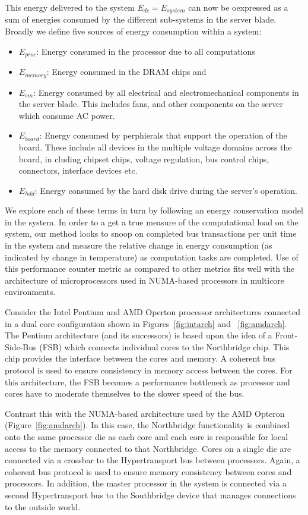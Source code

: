 \documentclass[12pt,onecolumn]{ULieeetran}
\begin{document}
This energy delivered to the system $E_{dc} = E_{system}$ can now be
oexpressed as a sum of energies consumed by the different sub-systems in
the server blade.  Broadly we define five sources of energy consumption
within a system:
\begin{itemize}
\item $E_{proc}$: Energy consumed in the processor due to all
  computations
\item $E_{memory}$: Energy consumed in the DRAM chips and
\item $E_{em}$: Energy consumed by all electrical and electromechanical
  components in the server blade.  This includes fans, and other
  components on the server which consume AC power.
\item $E_{board}$: Energy consumed by perphierals that support the
  operation of the board. These include all devices in the multiple
  voltage domains across the board, in cluding chipset chips, voltage
  regulation, bus control chips, connectors, interface devices etc.
\item $E_{hdd}$: Energy consumed by the hard disk drive during the
  server's operation.
\end{itemize}

We explore each of these terms in turn by following an energy
conservation model in the system.  In order to a get a true measure of
the computational load on the system, our method looks to snoop on
completed bus transactions per unit time in the system and measure the
relative change in energy consumption (as indicated by change in
temperature) as computation tasks are completed.  Use of this
performance counter metric as compared to other metrics fits well with
the architecture of microprocessors used in NUMA-based processors in
multicore environments.

Consider the Intel Pentium and AMD Operton processor architectures
connected in a dual core configuration shown in
Figures~\ref{fig:intarch} and ~\ref{fig:amdarch}.  The Pentium
architecture (and its successors) is based upon the idea of a
Front-Side-Bus (FSB) which connects individual cores to the Northbridge
chip.  This chip provides the interface between the cores and memory.  A
coherent bus protocol is used to ensure consistency in memory access
between the cores.  For this architecture, the FSB becomes a performance
bottleneck as processor and cores have to moderate themselves to the
slower speed of the bus.

Contrast this with the NUMA-based architecture used by the AMD Opteron
(Figure~\ref{fig:amdarch}).  In this case, the Northbridge functionality
is combined onto the same processor die as each core and each core is
responsible for local access to the memory connected to that
Northbridge. Cores on a single die are connected via a crossbar to the
Hypertransport bus between processors.  Again, a coherent bus protocol
is used to ensure memory consistency between cores and processors. In
addition, the master processor in the system is connected via a second
Hypertransport bus to the Southbridge device that manages connections to
the outside world.
\end{document}
